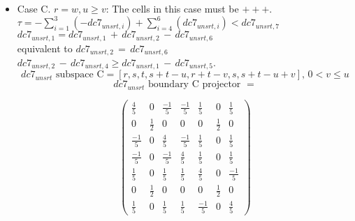 \documentclass[preprint]{iucr}              %
\begin{document}
{\begin{itemize}
     \item{Case C. $r=w, u \ge v$:  The cells in this case must be $+++$.\\
     $\tau=-\sum_{i=1}^3(-dc7_{unsrt,i})+\sum_{i=4}^6(dc7_{unsrt,i}) < dc7_{unsrt,7}$\\
     $dc7_{unsrt,1}=dc7_{unsrt,1}\,+\,dc7_{unsrt,2}\,-\,dc7_{unsrt,6}$\\
          equivalent to
     $dc7_{unsrt,2}\,=\,dc7_{unsrt,6}$\\
     $dc7_{unsrt,2}\,-\,dc7_{unsrt,4} \ge
     dc7_{unsrt,1}\,-\,dc7_{unsrt,5}$.
     \[dc7_{unsrt} \text{ subspace C}=[r,s,t,s+t-u,r+t-v,s,s+t-u+v],\, 0 <v \leq u \]
     \[dc7_{unsrt} \text{ boundary C projector } =\]
\begin{center}
\begin{equation*}
\begin{pmatrix}
\frac{4}{5}&0&\frac{-1}{5}&\frac{-1}{5}&\frac{1}{5}&0&\frac{1}{5}\\[.25em]
0&\frac{1}{2}&0&0&0&\frac{1}{2}&0\\[.25em]
\frac{-1}{5}&0&\frac{4}{5}&\frac{-1}{5}&\frac{1}{5}&0&\frac{1}{5}\\[.25em]
\frac{-1}{5}&0&\frac{-1}{5}&\frac{4}{5}&\frac{1}{5}&0&\frac{1}{5}\\[.25em]
\frac{1}{5}&0&\frac{1}{5}&\frac{1}{5}&\frac{4}{5}&0&\frac{-1}{5}\\[.25em]
0&\frac{1}{2}&0&0&0&\frac{1}{2}&0\\[.25em]
\frac{1}{5}&0&\frac{1}{5}&\frac{1}{5}&\frac{-1}{5}&0&\frac{4}{5}
\end{pmatrix}
\end{equation*}
\end{center}


}
\end{itemize}}
\end{document}
